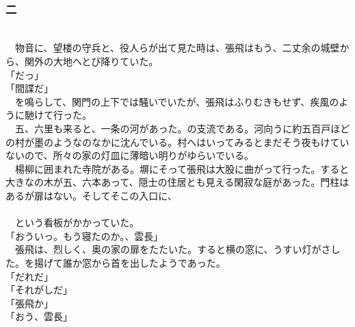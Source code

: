 \documentclass[
  paper=a5,
  fontsize=10pt,
  jafontsize=9.5pt,
  tate,                  %
  open_bracket_pos=nibu, %
]{jlreq}
\begin{document}
\\

\subsubsection{二}

\\


　物音に、望楼の守兵と、役人らが出て見た時は、張飛はもう、二丈余の城壁から、関外の大地へとび降りていた。\\


「だっ」\\


「間諜だ」\\


　を鳴らして、関門の上下では騒いでいたが、張飛はふりむきもせず、疾風のように馳けて行った。\\


　五、六里も来ると、一条の河があった。の支流である。河向うに約五百戸ほどの村が墨のようなのなかに沈んでいる。村へはいってみるとまだそう夜もけていないので、所々の家の灯皿に薄暗い明りがゆらいでいる。\\


　楊柳に囲まれた寺院がある。塀にそって張飛は大股に曲がって行った。すると大きなの木が五、六本あって、隠士の住居とも見える閑寂な庭があった。門柱はあるが扉はない。そしてそこの入口に、\\

\\



　という看板がかかっていた。\\


「おういっ。もう寝たのか。、雲長」\\


　張飛は、烈しく、奥の家の扉をたたいた。すると横の窓に、うすい灯がさした。を揚げて誰か窓から首を出したようであった。\\


「だれだ」\\


「それがしだ」\\


「張飛か」\\


「おう、雲長」\\
\end{document}

